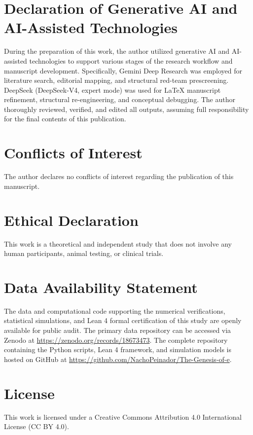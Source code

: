 \documentclass[10pt,a4paper]{article}
\begin{document}
\section*{Declaration of Generative AI and AI-Assisted Technologies}
During the preparation of this work, the author utilized generative AI and AI-assisted technologies to support various stages of the research workflow and manuscript development.
Specifically, Gemini Deep Research was employed for literature search, editorial mapping, and structural red-team prescreening. DeepSeek (DeepSeek-V4, expert mode) was used for LaTeX manuscript refinement, structural re-engineering, and conceptual debugging. The author thoroughly reviewed, verified, and edited all outputs, assuming full responsibility for the final contents of this publication.

\section*{Conflicts of Interest}
The author declares no conflicts of interest regarding the publication of this manuscript.

\section*{Ethical Declaration}
This work is a theoretical and independent study that does not involve any human participants, animal testing, or clinical trials.

\section*{Data Availability Statement}
The data and computational code supporting the numerical verifications, statistical simulations, and Lean 4 formal certification of this study are openly available for public audit.
The primary data repository can be accessed via Zenodo at \url{https://zenodo.org/records/18673473}.
The complete repository containing the Python scripts, Lean 4 framework, and simulation models is hosted on GitHub at \url{https://github.com/NachoPeinador/The-Genesis-of-e}.

\section*{License}
This work is licensed under a Creative Commons Attribution 4.0 International License (CC BY 4.0).
\end{document}
